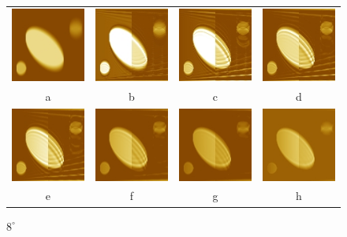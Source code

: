 \documentclass{procDDs}
\begin{document}
\begin{figure}[h!]\center%
	\begin{tabular}{cccc}
		\includegraphics[width=0.2\linewidth]{img/9/1.jpg}&
		\includegraphics[width=0.2\linewidth]{img/9/3.jpg}&
		\includegraphics[width=0.2\linewidth]{img/9/4.jpg}&
		\includegraphics[width=0.2\linewidth]{img/9/5.jpg}\\
		a & b & c & d\\
		\includegraphics[width=0.2\linewidth]{img/9/6.jpg}&
		\includegraphics[width=0.2\linewidth]{img/9/7.jpg}&
		\includegraphics[width=0.2\linewidth]{img/9/8.jpg}&
		\includegraphics[width=0.2\linewidth]{img/9/9.jpg}\\
		e & f & g & h
	\end{tabular}
	\caption{$8^\circ$}
	\label{ris:desc4}
\end{figure}
\end{document}
